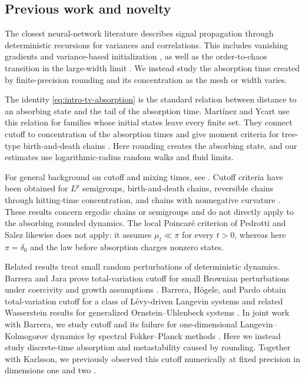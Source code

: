 \documentclass[11pt,reqno,a4paper]{article}
\begin{document}
\subsection{Previous work and novelty}
\label{subsec:previous-work}

The closest neural-network literature describes signal propagation through
deterministic recursions for variances and correlations. This includes
vanishing gradients and variance-based initialization
\cite{bengio-simard-frasconi1994,glorot-bengio2010,he-etal2015}, as well as the
order-to-chaos transition in the large-width limit
\cite{poole-etal2016,schoenholz-etal2017}. We instead study the absorption time
created by finite-precision rounding and its concentration as the mesh or
width varies.

The identity \cref{eq:intro-tv-absorption} is the standard relation between
distance to an absorbing state and the tail of the absorption time. Mart\'inez
and Ycart use this relation for families whose initial states leave every
finite set. They connect cutoff to concentration of the absorption times and
give moment criteria for tree-type birth-and-death chains
\cite{martinez-ycart2001}. Here rounding creates the absorbing state, and our
estimates use logarithmic-radius random walks and fluid limits.

For general background on cutoff and mixing times, see
\cite{diaconis1996,levin-peres-wilmer2017}. Cutoff criteria have been obtained
for $L^p$ semigroups, birth-and-death chains, reversible chains through
hitting-time concentration, and chains with nonnegative curvature
\cite{chen-saloff-coste2008,diaconis-saloff-coste2006,
ding-lubetzky-peres2010,basu-hermon-peres2017,salez2024-curvature}.
These results concern ergodic chains or semigroups and do not directly apply
to the absorbing rounded dynamics.
The local Poincar\'e criterion of Pedrotti and Salez
\cite{pedrotti-salez2026-local-product} likewise does not apply: it assumes
$\mu_t\ll\pi$ for every $t>0$, whereas here $\pi=\delta_0$ and the law before
absorption charges nonzero states.

Related results treat small random perturbations of deterministic dynamics.
Barrera and Jara prove total-variation cutoff for small Brownian perturbations
under coercivity and growth assumptions
\cite{barrera-jara2020}. Barrera, H\"ogele, and Pardo obtain
total-variation cutoff for a class of L\'evy-driven Langevin systems and
related Wasserstein results for generalized Ornstein--Uhlenbeck systems
\cite{barrera-hogele-pardo2021-tv,
barrera-hogele-pardo2021-wasserstein}. In joint work with Barrera, we study
cutoff and its failure for one-dimensional Langevin--Kolmogorov dynamics by
spectral Fokker--Planck methods
\cite{avelin-barrera2026-chi2-cutoff}. Here we instead study discrete-time
absorption and metastability caused by rounding. Together with Karlsson, we
previously observed this cutoff numerically at fixed precision in dimensions
one and two
\cite{avelin-karlsson2022}.
\end{document}
